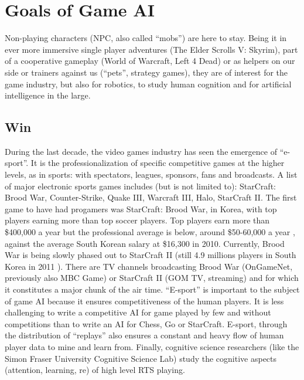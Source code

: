 \section{Goals of Game AI}
Non-playing characters (NPC, also called ``mobs'') are here to stay. Being it in ever more immersive single player adventures (The Elder Scrolls V: Skyrim), part of a cooperative gameplay (World of Warcraft, Left 4 Dead) or as helpers on our side or trainers against us (``pets'', strategy games), they are of interest for the game industry, but also for robotics, to study human cognition and for artificial intelligence in the large.

\subsection{Win}
During the last decade, the video games industry has seen the emergence of ``e-sport''. It is the professionalization of specific competitive games at the higher levels, as in sports: with spectators, leagues, sponsors, fans and broadcasts. A %
list of major electronic sports games includes (but is not limited to): StarCraft: Brood War, Counter-Strike, Quake III, Warcraft III, Halo, StarCraft II. The first game to have had progamers was StarCraft: Brood War, in Korea, with top players earning more than top soccer players. Top players earn more than \$400,000 a year but the professional average is below, around \$50-60,000 a year \citep{TeamLiquidPGMIncome}, against the average South Korean salary at \$16,300 in 2010. Currently, Brood War is being slowly phased out to StarCraft II (still 4.9 millions players in South Korea in 2011 \cite{CitationNeeded}). There are TV channels broadcasting Brood War (OnGameNet, previously also MBC Game) or StarCraft II (GOM TV, streaming) and for which it constitutes a major chunk of the air time. %
``E-sport'' is important to the subject of game AI because it ensures competitiveness of the human players. It is less challenging to write a competitive AI for game played by few and without competitions than to write an AI for Chess, Go or StarCraft. E-sport, through the distribution of ``replays'' also ensures a constant and heavy flow of human player data to mine and learn from. Finally, cognitive science researchers (like the Simon Fraser University Cognitive Science Lab) study the cognitive aspects (attention, learning, re) of high level RTS playing\cite{CitationNeeded}.


